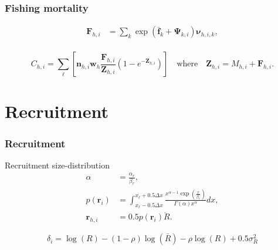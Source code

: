 \documentclass{beamer}
\begin{document}

\begin{frame}
\frametitle{Fishing mortality}
\begin{align*}
  \boldsymbol{F}_{h,i} &= \sum_k \exp \left( \bar{\boldsymbol{f}}_k +
    \boldsymbol\Psi_{k,i} \right) \boldsymbol\nu_{h,i,k},\\
\end{align*}

\begin{equation*}
  C_{h,i} = \sum_{\ell} \left[ \boldsymbol{n}_{h,i} \boldsymbol{w}_{h} \frac{\boldsymbol{F}_{h,i}}{\boldsymbol{Z}_{h,i}} 
    \left( 1 - e^{-\boldsymbol{Z}_{h,i}} \right) \right] \quad \text{where} \quad \boldsymbol{Z}_{h,i}
  = M_{h,i} + \boldsymbol{F}_{h,i}.
\end{equation*}

\end{frame}


\section{Recruitment}


\begin{frame}
\frametitle{Recruitment}
Recruitment size-distribution
\begin{align*}
  \alpha &= \frac{\alpha_r}{\beta_r},\\
  p(\boldsymbol{r}_i) &= \int^{x_\ell+0.5 \Delta x}_{x_\ell-0.5 \Delta x}
  \frac{x^{\alpha-1} \exp
    \left(\frac{x}{\beta_r}\right)}{\Gamma (\alpha) x^\alpha} dx,\\
  \boldsymbol{r}_{h,i} &= 0.5 p(\boldsymbol{r}_i) \ddot{R}.
\end{align*}

\begin{equation*}
  \delta_i = \log (R) - (1-\rho) \log (\bar{R}) - \rho \log(R) + 0.5 \sigma^2_R
\end{equation*}


\end{frame}
\end{document}
